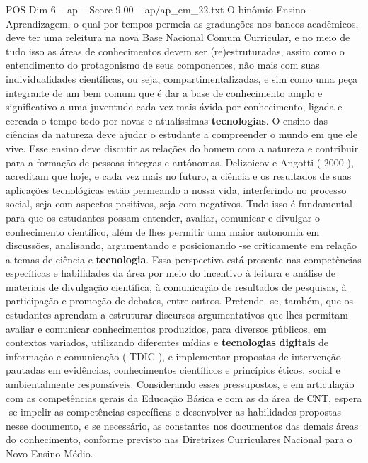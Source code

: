 \begin{textsample}{POS Dim 6 – ap – Score 9.00 – ap/ap\_em\_22.txt}
O binômio Ensino-Aprendizagem, o qual por tempos permeia as graduações nos bancos acadêmicos, deve ter uma releitura na nova Base Nacional Comum Curricular, e no meio de tudo isso as áreas de conhecimentos devem ser (re)estruturadas, assim como o entendimento do protagonismo de seus componentes, não mais com suas individualidades científicas, ou seja, compartimentalizadas, e sim como uma peça integrante de um bem comum que é dar a base de conhecimento amplo e significativo a uma juventude cada vez mais ávida por conhecimento, ligada e cercada o tempo todo por novas e atualíssimas \textbf{tecnologias}.
O ensino das ciências da natureza deve ajudar o estudante a compreender o mundo em que ele vive.
Esse ensino deve discutir as relações do homem com a natureza e contribuir para a formação de pessoas íntegras e autônomas.
Delizoicov e Angotti ( 2000 ), acreditam que hoje, e cada vez mais no futuro, a ciência e os resultados de suas aplicações tecnológicas estão permeando a nossa vida, interferindo no processo social, seja com aspectos positivos, seja com negativos.
Tudo isso é fundamental para que os estudantes possam entender, avaliar, comunicar e divulgar o conhecimento científico, além de lhes permitir uma maior autonomia em discussões, analisando, argumentando e posicionando -se criticamente em relação a temas de ciência e \textbf{tecnologia}.
Essa perspectiva está presente nas competências específicas e habilidades da área por meio do incentivo à leitura e análise de materiais de divulgação científica, à comunicação de resultados de pesquisas, à participação e promoção de debates, entre outros.
Pretende -se, também, que os estudantes aprendam a estruturar discursos argumentativos que lhes permitam avaliar e comunicar conhecimentos produzidos, para diversos públicos, em contextos variados, utilizando diferentes mídias e \textbf{tecnologias} \textbf{digitais} de informação e comunicação ( TDIC ), e implementar propostas de intervenção pautadas em evidências, conhecimentos científicos e princípios éticos, social e ambientalmente responsáveis.
Considerando esses pressupostos, e em articulação com as competências gerais da Educação Básica e com as da área de CNT, espera -se impelir as competências específicas e desenvolver as habilidades propostas nesse documento, e se necessário, as constantes nos documentos das demais áreas do conhecimento, conforme previsto nas Diretrizes Curriculares Nacional para o Novo Ensino Médio.

\end{textsample}
